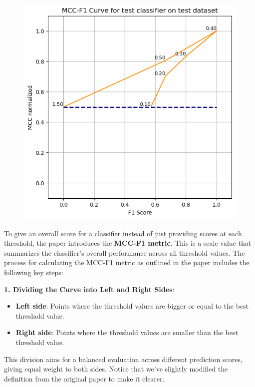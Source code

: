 \documentclass[12pt, oneside]{amsart}
\theoremstyle{definition}
\theoremstyle{remark}
\numberwithin{equation}{section}
\begin{document}
\begin{figure}[hbt!]
    \caption{}
    \centering
    \includegraphics[scale=0.4]{Report/Figure/figure1.jpg}
    \label{figure1}
\end{figure}
\FloatBarrier


To give an overall score for a classifier instead of just providing scores at each threshold, the paper introduces the \textbf{MCC-F1 metric}. This is a scale value that summarizes the classifier's overall performance across all threshold values. The process for calculating the MCC-F1 metric as outlined in the paper includes the following key steps:

\textbf{1. Dividing the Curve into Left and Right Sides}:
   \begin{itemize}
      \item \textbf{Left side}: Points where the threshold values are bigger or equal to the best threshold value. 
      \item \textbf{Right side}: Points where the threshold values are smaller than the best threshold value. 
   \end{itemize}
   This division aims for a balanced evaluation across different prediction scores, giving equal weight to both sides. Notice that we've slightly modified the definition from the original paper to make it clearer.
   
\end{document}
